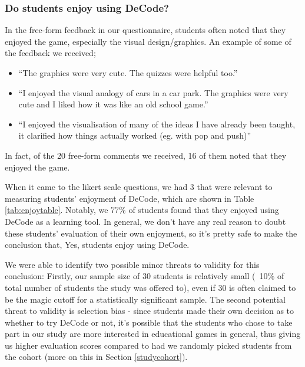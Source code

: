 \documentclass[11pt]{article}
\begin{document}
\subsubsection{Do students enjoy using DeCode?}
In the free-form feedback in our questionnaire, students often noted that they enjoyed the game, especially the visual design/graphics. An example of some of the feedback we received;
\begin{spacing}{1.5}
\begin{itemize}
  \item ``The graphics were very cute. The quizzes were helpful too.''
  \item ``I enjoyed the visual analogy of cars in a car park. The graphics were very cute and I liked how it was like an old school game.''
  \item ``I enjoyed the visualisation of many of the ideas I have already been taught, it clarified how things actually worked (eg. with pop and push)''
\end{itemize}
\end{spacing}
In fact, of the 20 free-form comments we received, 16 of them noted that they enjoyed the game.\par
When it came to the likert scale questions, we had 3 that were relevant to measuring students' enjoyment of DeCode, which are shown in Table \ref{tab:enjoytable}. Notably, we 77\% of students found that they enjoyed using DeCode as a learning tool. In general, we don't have any real reason to doubt these students' evaluation of their own enjoyment, so it's pretty safe to make the conclusion that, Yes, students enjoy using DeCode.\par
We were able to identify two possible minor threats to validity for this conclusion: Firstly, our sample size of 30 students is relatively small (~10\% of total number of students the study was offered to), even if 30 is often claimed to be the magic cutoff for a statistically significant sample. The second potential threat to validity is selection bias - since students made their own decision as to whether to try DeCode or not, it's possible that the students who chose to take part in our study are more interested in educational games in general, thus giving us higher evaluation scores compared to had we randomly picked students from the cohort (more on this in Section \ref{studycohort}).
\end{document}
